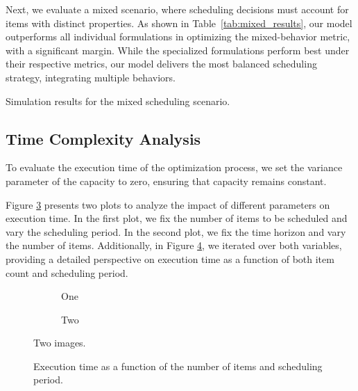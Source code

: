 \documentclass[12pt]{article}
\begin{document}
Next, we evaluate a mixed scenario, where scheduling decisions must account for items with distinct properties. As shown in Table~\ref{tab:mixed_results}, our model outperforms all individual formulations in optimizing the mixed-behavior metric, with a significant margin. While the specialized formulations perform best under their respective metrics, our model delivers the most balanced scheduling strategy, integrating multiple behaviors.

\begin{table}[h]
    \centering
    \caption{Simulation results for the mixed scheduling scenario.}
    \label{tab:mixed_results}
\end{table}

\subsection*{Time Complexity Analysis}

To evaluate the execution time of the optimization process, we set the variance parameter of the capacity to zero, ensuring that capacity remains constant.

Figure \ref{fig:time_complexity} presents two plots to analyze the impact of different parameters on execution time. In the first plot, we fix the number of items to be scheduled and vary the scheduling period. In the second plot, we fix the time horizon and vary the number of items. Additionally, in Figure \ref{fig:time_complexity_3d}, we iterated over both variables, providing a detailed perspective on execution time as a function of both item count and scheduling period.

\begin{figure}[h]
    \centering
    \begin{subfigure}{0.45\textwidth}
        \centering
        \caption{One}
        \label{fig:subcaption1}
    \end{subfigure}
    \hfill
    \begin{subfigure}{0.45\textwidth}
        \centering
        \caption{Two}
        \label{fig:subcaption2}
    \end{subfigure}
    \caption{Two images.}
    \label{fig:time_complexity}
\end{figure}

\begin{figure}[h]
    \centering
    \caption{Execution time as a function of the number of items and scheduling period.}
    \label{fig:time_complexity_3d}
\end{figure}
\end{document}
